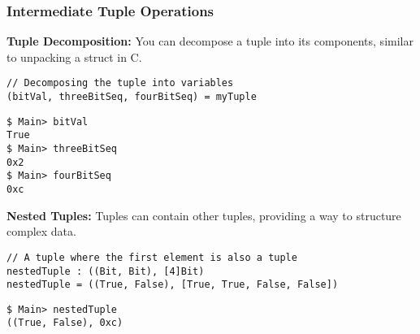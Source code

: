 \subsubsection{Intermediate Tuple Operations}
\textbf{Tuple Decomposition:} You can decompose a tuple into its components, similar to unpacking a struct in C.
\begin{lstlisting}[style=cryptol]
// Decomposing the tuple into variables
(bitVal, threeBitSeq, fourBitSeq) = myTuple
\end{lstlisting}
\begin{lstlisting}[style=zsh]
$ Main> bitVal
True
$ Main> threeBitSeq
0x2
$ Main> fourBitSeq
0xc
\end{lstlisting}
\vspace{16pt}
\textbf{Nested Tuples:} Tuples can contain other tuples, providing a way to structure complex data.
\begin{lstlisting}[style=cryptol]
// A tuple where the first element is also a tuple
nestedTuple : ((Bit, Bit), [4]Bit)
nestedTuple = ((True, False), [True, True, False, False])
\end{lstlisting}
\begin{lstlisting}[style=zsh]
$ Main> nestedTuple
((True, False), 0xc)
\end{lstlisting}

\newpage
